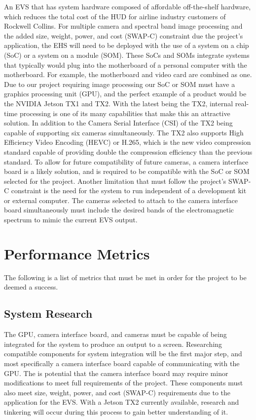 \documentclass[letterpaper,10pt,serif,draftclsnofoot,onecolumn,compsoc,titlepage]{IEEEtran}
\begin{document}
An EVS that has system hardware composed of affordable off-the-shelf hardware, which 
reduces the total cost of the HUD for airline industry customers of Rockwell 
Collins. For multiple camera and spectral band image processing and the added size, 
weight, power, and cost (SWAP-C) constraint due the project’s application, the 
EHS will need to be deployed with the use of a system on a chip (SoC) or a system on 
a module (SOM). These SoCs and SOMs integrate systems that typically would plug into 
the motherboard of a personal computer with the motherboard. For example, the 
motherboard and video card are combined as one. Due to our project requiring image 
processing our SoC or SOM must have a graphics processing unit (GPU), and the perfect 
example of a product would be the NVIDIA Jetson TX1 and TX2. With the latest being the 
TX2, internal real-time processing is one of its many capabilities that make this an 
attractive solution. In addition to the Camera Serial Interface (CSI) of the TX2 being 
capable of supporting six cameras simultaneously. The TX2 also supports High Efficiency 
Video Encoding (HEVC) or H.265, which is the new video compression standard capable of 
providing double the compression efficiency than the previous standard. To allow for 
future compatibility of future cameras, a camera interface board is a likely solution, 
and is required to be compatible with the SoC or SOM selected for the project. Another 
limitation that must follow the project’s SWAP-C constraint is the need for the system 
to run independent of a development kit or external computer. The cameras selected to 
attach to the camera interface board simultaneously must include the desired bands of
the electromagnetic spectrum to mimic the current EVS output.\\

\section{Performance Metrics}

The following is a list of metrics that must be met in order for the project to be 
deemed a success.\\

\subsection{System Research}

The GPU, camera interface board, and cameras must be capable of being integrated for 
the system to produce an output to a screen. Researching compatible components for 
system integration will be the first major step, and most specifically a camera 
interface board capable of communicating with the GPU. The is potential that the 
camera interface board may require minor modifications to meet full requirements of 
the project. These components must also meet size, weight, power, and cost (SWAP-C) 
requirements due to the application for the EVS. With a Jetson TX2 currently available, 
research and tinkering will occur during this process to gain better understanding of 
it.\\
\end{document}
